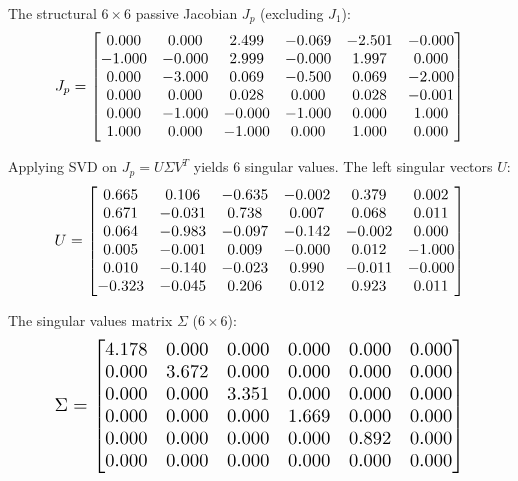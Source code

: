 \documentclass[12pt,a4paper]{article}
\begin{document}
The structural $6 \times 6$ passive Jacobian $J_p$ (excluding $J_1$):
\begin{equation}
    \resizebox{0.85\textwidth}{!}{$ J_p = \begin{bmatrix}
  0.000 & 0.000 & 2.499 & -0.069 & -2.501 & -0.000 \\
  -1.000 & -0.000 & 2.999 & -0.000 & 1.997 & 0.000 \\
  0.000 & -3.000 & 0.069 & -0.500 & 0.069 & -2.000 \\
  0.000 & 0.000 & 0.028 & 0.000 & 0.028 & -0.001 \\
  0.000 & -1.000 & -0.000 & -1.000 & 0.000 & 1.000 \\
  1.000 & 0.000 & -1.000 & 0.000 & 1.000 & 0.000
\end{bmatrix} $}
\end{equation}

Applying SVD on $J_p = U \Sigma V^T$ yields 6 singular values. The left singular vectors $U$:
\begin{equation}
    \resizebox{0.85\textwidth}{!}{$ U = \begin{bmatrix}
  0.665 & 0.106 & -0.635 & -0.002 & 0.379 & 0.002 \\
  0.671 & -0.031 & 0.738 & 0.007 & 0.068 & 0.011 \\
  0.064 & -0.983 & -0.097 & -0.142 & -0.002 & 0.000 \\
  0.005 & -0.001 & 0.009 & -0.000 & 0.012 & -1.000 \\
  0.010 & -0.140 & -0.023 & 0.990 & -0.011 & -0.000 \\
  -0.323 & -0.045 & 0.206 & 0.012 & 0.923 & 0.011
\end{bmatrix} $}
\end{equation}

The singular values matrix $\Sigma$ ($6 \times 6$):
\begin{equation}
    \resizebox{0.85\textwidth}{!}{$ \Sigma = \begin{bmatrix}
  4.178 & 0.000 & 0.000 & 0.000 & 0.000 & 0.000 \\
  0.000 & 3.672 & 0.000 & 0.000 & 0.000 & 0.000 \\
  0.000 & 0.000 & 3.351 & 0.000 & 0.000 & 0.000 \\
  0.000 & 0.000 & 0.000 & 1.669 & 0.000 & 0.000 \\
  0.000 & 0.000 & 0.000 & 0.000 & 0.892 & 0.000 \\
  0.000 & 0.000 & 0.000 & 0.000 & 0.000 & 0.000
\end{bmatrix} $}
\end{equation}
\end{document}
